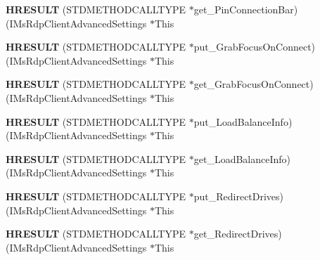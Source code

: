 \begin{DoxyCompactItemize}
{\bfseries H\+R\+E\+S\+U\+LT} (S\+T\+D\+M\+E\+T\+H\+O\+D\+C\+A\+L\+L\+T\+Y\+PE $\ast$get\+\_\+\+Pin\+Connection\+Bar)(I\+Ms\+Rdp\+Client\+Advanced\+Settings $\ast$This
\item 
\mbox{\label{struct_i_ms_rdp_client_advanced_settings_vtbl_a3ce35435d6a4abbf458bc95faffbc5d4}} 
{\bfseries H\+R\+E\+S\+U\+LT} (S\+T\+D\+M\+E\+T\+H\+O\+D\+C\+A\+L\+L\+T\+Y\+PE $\ast$put\+\_\+\+Grab\+Focus\+On\+Connect)(I\+Ms\+Rdp\+Client\+Advanced\+Settings $\ast$This
\item 
\mbox{\label{struct_i_ms_rdp_client_advanced_settings_vtbl_a7229be0e6690a0a0e6ded25598eed185}} 
{\bfseries H\+R\+E\+S\+U\+LT} (S\+T\+D\+M\+E\+T\+H\+O\+D\+C\+A\+L\+L\+T\+Y\+PE $\ast$get\+\_\+\+Grab\+Focus\+On\+Connect)(I\+Ms\+Rdp\+Client\+Advanced\+Settings $\ast$This
\item 
\mbox{\label{struct_i_ms_rdp_client_advanced_settings_vtbl_acf996694be33f6cbbbaabbd35146369d}} 
{\bfseries H\+R\+E\+S\+U\+LT} (S\+T\+D\+M\+E\+T\+H\+O\+D\+C\+A\+L\+L\+T\+Y\+PE $\ast$put\+\_\+\+Load\+Balance\+Info)(I\+Ms\+Rdp\+Client\+Advanced\+Settings $\ast$This
\item 
\mbox{\label{struct_i_ms_rdp_client_advanced_settings_vtbl_af1d80dab996552ca75e0835ab9d260f3}} 
{\bfseries H\+R\+E\+S\+U\+LT} (S\+T\+D\+M\+E\+T\+H\+O\+D\+C\+A\+L\+L\+T\+Y\+PE $\ast$get\+\_\+\+Load\+Balance\+Info)(I\+Ms\+Rdp\+Client\+Advanced\+Settings $\ast$This
\item 
\mbox{\label{struct_i_ms_rdp_client_advanced_settings_vtbl_ad67ad9e14cb6bb5624ef28f688b224a2}} 
{\bfseries H\+R\+E\+S\+U\+LT} (S\+T\+D\+M\+E\+T\+H\+O\+D\+C\+A\+L\+L\+T\+Y\+PE $\ast$put\+\_\+\+Redirect\+Drives)(I\+Ms\+Rdp\+Client\+Advanced\+Settings $\ast$This
\item 
\mbox{\label{struct_i_ms_rdp_client_advanced_settings_vtbl_ab1fe17de848b30fbfd3a800abf4cec55}} 
{\bfseries H\+R\+E\+S\+U\+LT} (S\+T\+D\+M\+E\+T\+H\+O\+D\+C\+A\+L\+L\+T\+Y\+PE $\ast$get\+\_\+\+Redirect\+Drives)(I\+Ms\+Rdp\+Client\+Advanced\+Settings $\ast$This
\item 

\end{DoxyCompactItemize}
